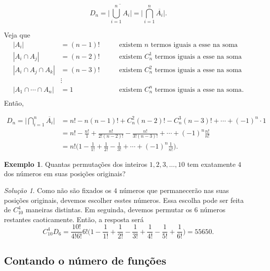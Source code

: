 \documentclass[]{book}
\theoremstyle{definition}
\theoremstyle{definition}
\newtheorem{example}{Exemplo}[chapter]
\theoremstyle{definition}
\theoremstyle{remark}
\newtheorem*{solution}{Solução}
\begin{document}
\[D_n = \Bigg|\overline{\bigcup_{i=1}^{n} A_i} \Bigg| = \Bigg|{\bigcap_{i=1}^{n} \overline{A_i}}\Bigg|.\]

Veja que
\begin{align}
|A_i| &= (n-1)! &\qquad \text{existem $n$ termos iguais a esse na soma}\\
|A_i\cap A_j| &= (n-2)! &\qquad \text{existem $C_n^1$ termos iguais a esse na soma}\\
|A_i\cap A_j \cap A_k| &= (n-3)! &\qquad \text{existem $C_n^2$ termos iguais a esse na soma}\\
&\vdots \\
|A_1\cap\cdots\cap A_n| &= 1 &\qquad \text{existem $C_n^n$ termos iguais a esse na soma}.\\
\end{align}
Então,

\begin{align}
D_n = \Bigg|{\bigcap_{i=1}^{n} \overline{A_i}}\Bigg| 
&= n! - n(n-1)! + C_n^2(n-2)! - C_n^3(n-3)! + \cdots + (-1)^n\cdot 1 \\
&= n! - \frac{n!}{1} +  \frac{n!}{2!(n-2)!} - \frac{n!}{3!(n-3)!} + \cdots + (-1)^n\frac{n!}{n!}\\
&= n! \Bigg(1 - \frac{1}{1!} + \frac{1}{2!} - \frac{1}{3!} + \cdots +(-1)^n\frac{1}{n!}\Bigg).
\end{align}

\begin{example}
\protect\hypertarget{exm:unnamed-chunk-81}{}{\label{exm:unnamed-chunk-81} }Quantas permutações dos inteiros \(1,2,3,\ldots,10\) tem exatamente \(4\) dos números em suas posições originais?
\end{example}

\begin{solution}
\iffalse{} {Solução. } \fi{}Como não são fixados os \(4\) números que permanecerão nas suas posições originais, devemos escolher esstes números.
Essa escolha pode ser feita de \(C_{10}^4\) maneiras distintas.
Em seguinda, devemos permutar os \(6\) números restantes caoticamente.
Então, a resposta será
\[C_{10}^4 D_6 = \frac{10!}{4!6!} 6! \Bigg(1 - \frac{1}{1!} + \frac{1}{2!} - \frac{1}{3!} + \frac{1}{4!} - \frac{1}{5!} + \frac{1}{6!}\Bigg) = 55650.\]
\end{solution}

\hypertarget{contando-o-nuxfamero-de-funuxe7uxf5es}{%
\subsection{Contando o número de funções}\label{contando-o-nuxfamero-de-funuxe7uxf5es}}
\end{document}
